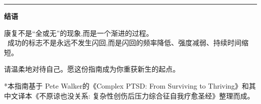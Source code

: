\documentclass[11pt, a4paper]{article}
\begin{document}
\newpage

\thispagestyle{empty}
\begin{center}
    \vspace*{5cm}
    \color{HealingPurple}
    \hrule
    \vspace{0.8cm}
    {\Large \textbf{结语}}
    \vspace{0.8cm}
    
    \begin{minipage}{0.95\textwidth}
        \raggedright 
        \large
        康复不是“全或无”的现象,而是一个渐进的过程。\\\
        成功的标志不是永远不发生闪回,而是闪回的频率降低、强度减弱、持续时间缩短。
        \vspace{0.5cm}
        
        请温柔地对待自己。愿这份指南成为你重获新生的起点。
    \end{minipage}
    
    \vspace{4cm}
    \footnotesize\color{TextDark}
    *本指南基于 Pete Walker的《Complex PTSD: From Surviving to Thriving》和其中文译本《不原谅也没关系:
    复杂性创伤后压力综合征自我疗愈圣经》整理而成。
\end{center}
\end{document}
